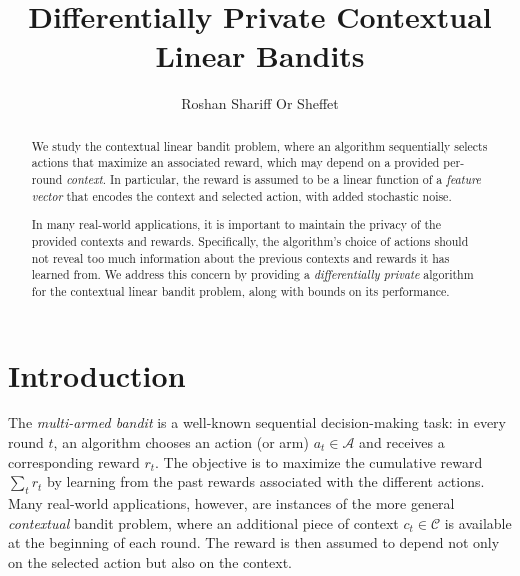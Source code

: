 \documentclass{article}
\title{Differentially Private Contextual Linear Bandits}
\author{
  Roshan Shariff
  \And
  Or Sheffet
}
\newcommand{\A}{\mathcal{A}}
\newcommand{\C}{\mathcal{C}}
\begin{document}
\maketitle

\begin{abstract}
  We study the contextual linear bandit problem, where an algorithm
  sequentially selects actions that maximize an associated reward,
  which may depend on a provided per-round \emph{context}.  In
  particular, the reward is assumed to be a linear function of a
  \emph{feature vector} that encodes the context and selected action,
  with added stochastic noise.

  In many real-world applications, it is important to maintain the
  privacy of the provided contexts and rewards.  Specifically, the
  algorithm's choice of actions should not reveal too much information
  about the previous contexts and rewards it has learned from.  We
  address this concern by providing a \emph{differentially private}
  algorithm for the contextual linear bandit problem, along with
  bounds on its performance.
\end{abstract}

\section{Introduction}
\label{sec:introduction}

The \emph{multi-armed bandit} is a well-known sequential
decision-making task: in every round $t$, an algorithm chooses an
action (or arm) $a_t\in\A$ and receives a corresponding reward $r_t$.
The objective is to maximize the cumulative reward $\sum_tr_t$ by
learning from the past rewards associated with the different actions.
Many real-world applications, however, are instances of the more
general \emph{contextual} bandit problem, where an additional piece of
context $c_t\in\C$ is available at the beginning of each round.  The
reward is then assumed to depend not only on the selected action but
also on the context.

\end{document}
